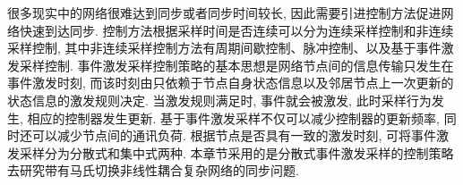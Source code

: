     很多现实中的网络很难达到同步或者同步时间较长, 因此需要引进控制方法促进网络快速到达同步. 控制方法根据采样时间是否连续可以分为连续采样控制和非连续采样控制, 其中非连续采样控制方法有周期间歇控制、脉冲控制、以及基于事件激发采样控制. 事件激发采样控制策略的基本思想是网络节点间的信息传输只发生在事件激发时刻, 而该时刻由只依赖于节点自身状态信息以及邻居节点上一次更新的状态信息的激发规则决定. 当激发规则满足时, 事件就会被激发, 此时采样行为发生, 相应的控制器发生更新. 基于事件激发采样不仅可以减少控制器的更新频率, 同时还可以减少节点间的通讯负荷. 根据节点是否具有一致的激发时刻, 可将事件激发采样分为分散式和集中式两种. 本章节采用的是分散式事件激发采样的控制策略去研究带有马氏切换非线性耦合复杂网络的同步问题.


